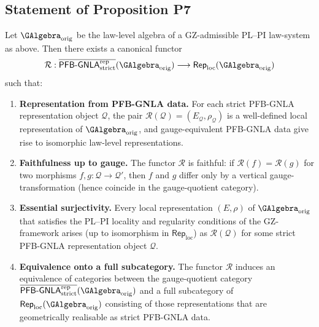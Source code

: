 \documentclass[11pt]{book}
\theoremstyle{plain}
\theoremstyle{definition}
\begin{document}
\subsection*{Statement of Proposition P7}


\begin{proposition}
\label{prop:P7-law-algebra-PFB-GNLA}
Let \(\GAlgebra_{\mathrm{orig}}\) be the law-level algebra of a
GZ-admissible PL--PI law-system as above.  Then there exists a
canonical functor
\[
  \mathcal{R} :
  \overline{\mathsf{PFB\text- GNLA}^{\mathrm{rep}}_{\mathrm{strict}}}
    (\GAlgebra_{\mathrm{orig}})
  \longrightarrow
  \mathsf{Rep}_{\mathrm{loc}}(\GAlgebra_{\mathrm{orig}})
\]
such that:

\begin{enumerate}
  \item[\textnormal{(1)}] \textbf{Representation from PFB-GNLA data.}
    For each strict PFB-GNLA representation object \(\mathcal{Q}\),
    the pair \(\mathcal{R}(\mathcal{Q})=(E_{\mathcal{Q}},\rho_{\mathcal{Q}})\)
    is a well-defined local representation of \(\GAlgebra_{\mathrm{orig}}\),
    and gauge-equivalent PFB-GNLA data give rise to isomorphic law-level
    representations.
  \item[\textnormal{(2)}] \textbf{Faithfulness up to gauge.}
    The functor \(\mathcal{R}\) is faithful: if
    \(\mathcal{R}(f)=\mathcal{R}(g)\) for two morphisms
    \(f,g:\mathcal{Q}\to\mathcal{Q}'\), then \(f\) and \(g\) differ
    only by a vertical gauge-transformation (hence coincide in the
    gauge-quotient category).
  \item[\textnormal{(3)}] \textbf{Essential surjectivity.}
    Every local representation \((E,\rho)\) of
    \(\GAlgebra_{\mathrm{orig}}\) that satisfies the PL--PI locality
    and regularity conditions of the GZ-framework arises (up to
    isomorphism in \(\mathsf{Rep}_{\mathrm{loc}}\)) as
    \(\mathcal{R}(\mathcal{Q})\) for some strict PFB-GNLA
    representation object \(\mathcal{Q}\).
  \item[\textnormal{(4)}] \textbf{Equivalence onto a full subcategory.}
    The functor \(\mathcal{R}\) induces an equivalence of categories
    between the gauge-quotient category
    \(\overline{\mathsf{PFB\text- GNLA}^{\mathrm{rep}}_{\mathrm{strict}}}
     (\GAlgebra_{\mathrm{orig}})\) and a full subcategory of
    \(\mathsf{Rep}_{\mathrm{loc}}(\GAlgebra_{\mathrm{orig}})\)
    consisting of those representations that are geometrically
    realisable as strict PFB-GNLA data.
\end{enumerate}
\end{proposition}
\end{document}

